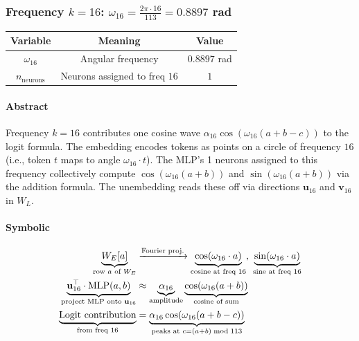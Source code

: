 \documentclass[11pt,a4paper]{article}
\begin{document}
\subsubsection{Frequency $k = 16$: $\omega_{16} = \frac{2\pi \cdot 16}{113} = 0.8897$ rad}

\begin{center}
\begin{tabular}{|c|c|c|}
\hline
\textbf{Variable} & \textbf{Meaning} & \textbf{Value} \\ \hline
  $\omega_{16}$ & Angular frequency & $0.8897$ rad \\ \hline
  $n_{\text{neurons}}$ & Neurons assigned to freq $16$ & $1$ \\ \hline
\end{tabular}
\end{center}

\paragraph{Abstract}
Frequency $k = 16$ contributes one cosine wave $\alpha_{16} \cos(\omega_{16}(a+b-c))$ to the logit formula. The embedding encodes tokens as points on a circle of frequency $16$ (i.e., token $t$ maps to angle $\omega_{16} \cdot t$). The MLP's 1 neurons assigned to this frequency collectively compute $\cos(\omega_{16}(a+b))$ and $\sin(\omega_{16}(a+b))$ via the addition formula. The unembedding reads these off via directions $\mathbf{u}_{16}$ and $\mathbf{v}_{16}$ in $W_L$.

\paragraph{Symbolic}
\begin{align}
    \underbrace{W_E[a]}_{\text{row } a \text{ of } W_E} &\xrightarrow{\text{Fourier proj.}} \underbrace{\cos\!\left(\omega_{16} \cdot a\right)}_{\text{cosine at freq } 16},\;\underbrace{\sin\!\left(\omega_{16} \cdot a\right)}_{\text{sine at freq } 16}    \notag \\
    \underbrace{\mathbf{u}_{16}^\top \cdot \text{MLP}(a,b)}_{\text{project MLP onto } \mathbf{u}_{16}} &\approx \underbrace{\alpha_{16}}_{\text{amplitude}} \underbrace{\cos(\omega_{16}(a+b))}_{\text{cosine of sum}}    \notag \\
    \underbrace{\text{Logit contribution}}_{\text{from freq } 16} &= \underbrace{\alpha_{16} \cos(\omega_{16}(a+b-c))}_{\text{peaks at } c = (a+b) \bmod 113}    \notag
\end{align}
\end{document}

